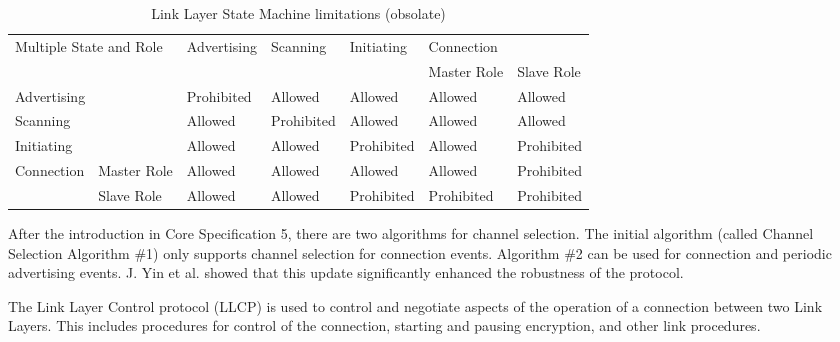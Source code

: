 \begin{table}[]
    \begin{tabular}{lllllll}
        \multicolumn{2}{l}{\multirow{2}{*}{Multiple State and Role}} & \multirow{2}{*}{Advertising} & \multirow{2}{*}{Scanning} & \multirow{2}{*}{Initiating} & \multicolumn{2}{l}{Connection}                           \\
        \multicolumn{2}{l}{}                                         &                              &                           &                             & Master Role                    & Slave Role              \\
        \multicolumn{2}{l}{Advertising}                              & Prohibited                   & Allowed                   & Allowed                     & Allowed                        & Allowed                 \\
        \multicolumn{2}{l}{Scanning}                                 & Allowed                      & Prohibited                & Allowed                     & Allowed                        & Allowed                 \\
        \multicolumn{2}{l}{Initiating}                               & Allowed                      & Allowed                   & Prohibited                  & Allowed                        & Prohibited              \\
        \multicolumn{1}{c}{\multirow{2}{*}{Connection}}              & Master Role                  & Allowed                   & Allowed                     & Allowed                        & Allowed    & Prohibited \\
        \multicolumn{1}{c}{}                                         & Slave Role                   & Allowed                   & Allowed                     & Prohibited                     & Prohibited & Prohibited
    \end{tabular}
    \caption{Link Layer State Machine limitations (obsolate)}
    \label{tab:llstate_limit}
\end{table}

After the introduction in Core Specification 5, there are two algorithms for
channel selection.
The initial algorithm (called Channel Selection Algorithm \#1) only supports
channel selection for connection events.
Algorithm \#2 can be used for connection and periodic advertising events.
J. Yin et al. showed that this update significantly enhanced the robustness
of the protocol. \cite{Yin:19}

The Link Layer Control protocol (LLCP) is used to control and
negotiate aspects of the operation of a connection between two Link Layers.
This includes procedures for control of the connection, starting and pausing
encryption, and other link procedures. \cite{bt40}

